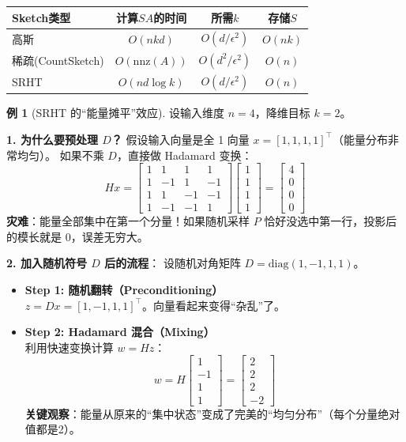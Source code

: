 \documentclass[11pt,a4paper]{ctexart}
\theoremstyle{definition}
\newtheorem{example}[theorem]{例}
\theoremstyle{remark}
\begin{document}
\begin{center}
\begin{tabular}{lccc}
\toprule
Sketch类型 & 计算$SA$的时间 & 所需$k$ & 存储$S$ \\
\midrule
高斯 & $O(nkd)$ & $O(d/\epsilon^2)$ & $O(nk)$ \\
稀疏(CountSketch) & $O(\text{nnz}(A))$ & $O(d^2/\epsilon^2)$ & $O(n)$ \\
SRHT & $O(nd\log k)$ & $O(d/\epsilon^2)$ & $O(n)$ \\
\bottomrule
\end{tabular}
\end{center}

\begin{example}[SRHT 的“能量摊平”效应]
    设输入维度 $n=4$，降维目标 $k=2$。
    
    \textbf{1. 为什么要预处理 $D$？}
    假设输入向量是全 1 向量 $x = [1, 1, 1, 1]^\top$（能量分布非常均匀）。
    如果不乘 $D$，直接做 Hadamard 变换：
    \[
    H x = \begin{bmatrix}
    1 & 1 & 1 & 1 \\
    1 & -1 & 1 & -1 \\
    1 & 1 & -1 & -1 \\
    1 & -1 & -1 & 1
    \end{bmatrix}
    \begin{bmatrix}
    1 \\ 1 \\ 1 \\ 1
    \end{bmatrix}
    =
    \begin{bmatrix}
    4 \\ 0 \\ 0 \\ 0
    \end{bmatrix}
    \]
    \textbf{灾难}：能量全部集中在第一个分量！如果随机采样 $P$ 恰好没选中第一行，投影后的模长就是 0，误差无穷大。

    \textbf{2. 加入随机符号 $D$ 后的流程}：
    设随机对角矩阵 $D = \text{diag}(1, -1, 1, 1)$。
    \begin{itemize}
        \item \textbf{Step 1: 随机翻转（Preconditioning）} \\
        $z = Dx = [1, -1, 1, 1]^\top$。向量看起来变得“杂乱”了。
        
        \item \textbf{Step 2: Hadamard 混合（Mixing）} \\
        利用快速变换计算 $w = Hz$：
        \[
        w = H \begin{bmatrix} 1 \\ -1 \\ 1 \\ 1 \end{bmatrix} = \begin{bmatrix} 2 \\ 2 \\ 2 \\ -2 \end{bmatrix}
        \]
        \textbf{关键观察}：能量从原来的“集中状态”变成了完美的“均匀分布”（每个分量绝对值都是2）。
        

\end{itemize}
\end{example}
\end{document}
